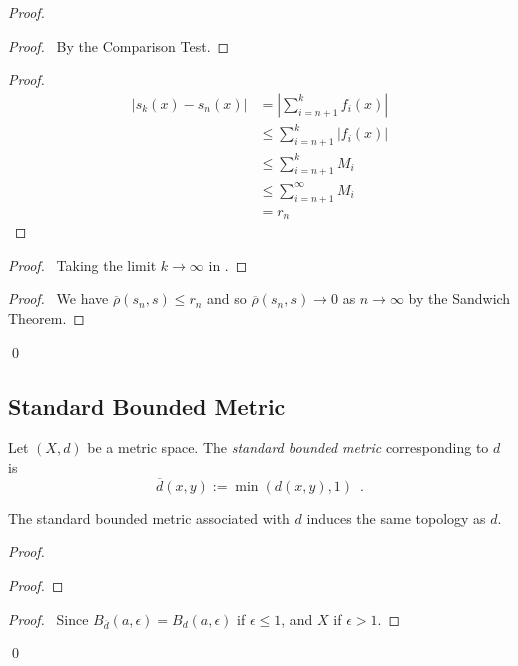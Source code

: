 \begin{proof}
\pf
{}
\begin{proof}
	\pf\ By the Comparison Test.
\end{proof}
\begin{proof}
	\pf
	\begin{align*}
		|s_k(x) - s_n(x)| & = \left| \sum_{i=n+1}^k f_i(x) \right| \\
		& \leq \sum_{i=n+1}^k |f_i(x)| \\
		& \leq \sum_{i=n+1}^k M_i \\
		& \leq \sum_{i=n+1}^\infty M_i \\
		& = r_n
	\end{align*}
\end{proof}
\begin{proof}
	\pf\ Taking the limit $k \rightarrow \infty$ in .
\end{proof}
\begin{proof}
	\pf\ We have $\overline{\rho}(s_n,s) \leq r_n$ and so $\overline{\rho}(s_n,s) \rightarrow 0$ as $n \rightarrow \infty$ by the Sandwich Theorem.
\end{proof}
\qed
\end{proof}

\subsection{Standard Bounded Metric}

\begin{df}
Let $(X,d)$ be a metric space. The \emph{standard bounded metric} corresponding to $d$ is
\[ \overline{d}(x,y) := \min(d(x,y),1) \enspace . \]
\end{df}

\begin{prop}
The standard bounded metric associated with $d$ induces the same topology as $d$.
\end{prop}

\begin{proof}
\pf
{}
\begin{proof}
\end{proof}
\begin{proof}
	\pf\ Since $B_{\overline{d}}(a, \epsilon) = B_d(a, \epsilon)$ if $\epsilon \leq 1$, and $X$ if $\epsilon > 1$.
\end{proof}
\qed
\end{proof}

